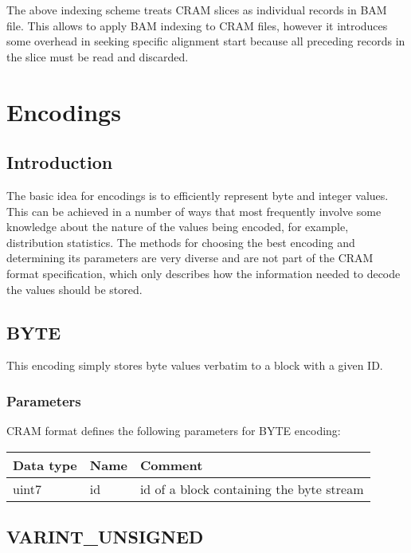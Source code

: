 \documentclass[a4paper]{article}
\begin{document}
The above indexing scheme treats CRAM slices as individual records in BAM file. 
This allows to apply BAM indexing to CRAM files, however it introduces some overhead 
in seeking specific alignment start because all preceding records in the slice 
must be read and discarded.

\section{Encodings}
\label{sec:encodings}


\subsection{Introduction}

The basic idea for encodings is to efficiently represent byte and integer values.
This can be achieved in a number of ways that most frequently involve some knowledge 
about the nature of the values being encoded, for example, distribution statistics. 
The methods for choosing the best encoding and determining its parameters are very 
diverse and are not part of the CRAM format specification, which only describes 
how the information needed to decode the values should be stored.

\subsection{BYTE}

This encoding simply stores byte values verbatim to a block with a given ID.

\subsubsection*{Parameters}

CRAM format defines the following parameters for BYTE encoding: 

\begin{tabular}{|>{\raggedright}p{100pt}|>{\raggedright}p{100pt}|>{\raggedright}p{230pt}|}
\hline
\textbf{Data type} & \textbf{Name} & \textbf{Comment}
\tabularnewline
\hline
uint7 & id & id of a block containing the byte stream\tabularnewline
\hline
\end{tabular}

\subsection{VARINT\_UNSIGNED}
\end{document}
